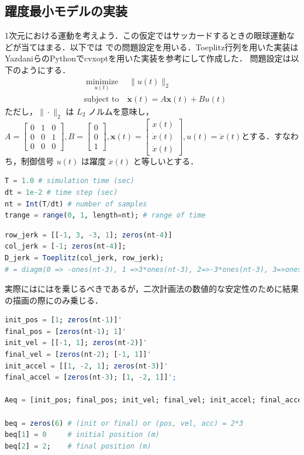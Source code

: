 \subsection{躍度最小モデルの実装}
1次元における運動を考えよう．この仮定ではサッカードするときの眼球運動などが当てはまる．以下では \citep{Yazdani2012-sx} での問題設定を用いる．Toeplitz行列を用いた実装はYazdaniらのPythonでcvxoptを用いた実装を参考にして作成した．
問題設定は以下のようにする．
\begin{align}
&\underset{u(t)}{\operatorname{minimize}}\quad \|u(t)\|_2 \\
&\text{subject to} \quad \dot{\mathbf{x}}(t)=A \mathbf{x}(t)+B u(t)
\end{align}
ただし，$\|\cdot\|_{2}$ は $L_{2}$ ノルムを意味し，$A=\left[\begin{array}{lll}0 & 1 & 0 \\ 0 & 0 & 1 \\ 0 & 0 & 0\end{array}\right], B=\left[\begin{array}{l}0 \\ 0 \\ 1\end{array}\right], \mathbf{x}(t)=\left[\begin{array}{l}x(t) \\ \dot{x}(t) \\ \ddot{x}(t)\end{array}\right], u(t)=\dddot x(t)$とする．すなわち，制御信号 $u(t)$ は躍度 $\dddot x(t)$ と等しいとする．
\begin{lstlisting}[language=julia]
T = 1.0 # simulation time (sec)
dt = 1e-2 # time step (sec)
nt = Int(T/dt) # number of samples
trange = range(0, 1, length=nt); # range of time 
\end{lstlisting}
\begin{lstlisting}[language=julia]
row_jerk = [[-1, 3, -3, 1]; zeros(nt-4)]
col_jerk = [-1; zeros(nt-4)];
D_jerk = Toeplitz(col_jerk, row_jerk); 
# = diagm(0 => -ones(nt-3), 1 =>3*ones(nt-3), 2=>-3*ones(nt-3), 3=>ones(nt-3))[1:end-3, :]
\end{lstlisting}
実際にはにはを乗じるべきであるが，二次計画法の数値的な安定性のために結果の描画の際にのみ乗じる．
\begin{lstlisting}[language=julia]
init_pos = [1; zeros(nt-1)]'
final_pos = [zeros(nt-1); 1]'
init_vel = [[-1, 1]; zeros(nt-2)]'
final_vel = [zeros(nt-2); [-1, 1]]'
init_accel = [[1, -2, 1]; zeros(nt-3)]'
final_accel = [zeros(nt-3); [1, -2, 1]]';

Aeq = [init_pos; final_pos; init_vel; final_vel; init_accel; final_accel];

beq = zeros(6) # (init or final) or (pos, vel, acc) = 2*3
beq[1] = 0     # initial position (m)
beq[2] = 2;    # final position (m) 
\end{lstlisting}
